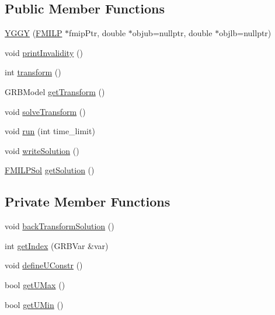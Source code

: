 \subsection*{Public Member Functions}
\begin{DoxyCompactItemize}
\item 
\hyperlink{classgrbfrc_1_1ObjVarTransform_a15bc0df158294029b1a47cbd61f876c2}{Y\+G\+GY} (\hyperlink{classgrbfrc_1_1FMILP}{F\+M\+I\+LP} $\ast$fmip\+Ptr, double $\ast$objub=nullptr, double $\ast$objlb=nullptr)
\item 
void \hyperlink{classgrbfrc_1_1ObjVarTransform_ac335360e5552b0ab4310af36ec3b1569}{print\+Invalidity} ()
\item 
int \hyperlink{classgrbfrc_1_1ObjVarTransform_a34378e1e49b4cd057a4e388699a83ee8}{transform} ()
\item 
G\+R\+B\+Model \hyperlink{classgrbfrc_1_1ObjVarTransform_a81790f33a25f3daed9a002fcb0d7bf80}{get\+Transform} ()
\item 
void \hyperlink{classgrbfrc_1_1ObjVarTransform_a23e5d676c837eff9f952299f19944f7d}{solve\+Transform} ()
\item 
void \hyperlink{classgrbfrc_1_1ObjVarTransform_a94fa0bf9fc9193617ba4468fbb14f07d}{run} (int time\+\_\+limit)
\item 
void \hyperlink{classgrbfrc_1_1ObjVarTransform_a6af64131ae2f937e1db87187c8d824eb}{write\+Solution} ()
\item 
\hyperlink{structgrbfrc_1_1FMILPSol}{F\+M\+I\+L\+P\+Sol} \hyperlink{classgrbfrc_1_1ObjVarTransform_ab517bedf3c236382e114231502ff948a}{get\+Solution} ()
\end{DoxyCompactItemize}
\subsection*{Private Member Functions}
\begin{DoxyCompactItemize}
\item 
void \hyperlink{classgrbfrc_1_1ObjVarTransform_abf329f8d35f975917bd5b0934dd08f0c}{back\+Transform\+Solution} ()
\item 
int \hyperlink{classgrbfrc_1_1ObjVarTransform_a7133fe02b0c46d105ec60b35fccb6d94}{get\+Index} (G\+R\+B\+Var \&var)
\item 
void \hyperlink{classgrbfrc_1_1ObjVarTransform_a13b170b85ba3412e2938951e13f040ad}{define\+U\+Constr} ()
\item 
bool \hyperlink{classgrbfrc_1_1ObjVarTransform_a10a106d7b3f65bd188ebe560cc1b54f7}{get\+U\+Max} ()
\item 
bool \hyperlink{classgrbfrc_1_1ObjVarTransform_a98c148839783950b0d9d2366737ff4e2}{get\+U\+Min} ()
\end{DoxyCompactItemize}

